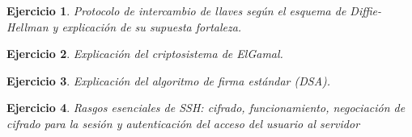 \documentclass[
  a4paper,
  spanish,
  12pt,
]{scrartcl}
\theoremstyle{ejercicio-style}
\newtheorem{ejer}{Ejercicio}
\theoremstyle{remark-style}
\begin{document}
\begin{ejer}
  Protocolo de intercambio de llaves según el esquema de Diffie-Hellman y explicación de su supuesta fortaleza.
\end{ejer}

\begin{ejer}
  Explicación del criptosistema de ElGamal.
\end{ejer}

\begin{ejer}
  Explicación del algoritmo de firma estándar (DSA).
\end{ejer}

\begin{ejer}
  Rasgos esenciales de SSH: cifrado, funcionamiento, negociación de cifrado para la sesión y autenticación del acceso del usuario al servidor
\end{ejer}
\end{document}
